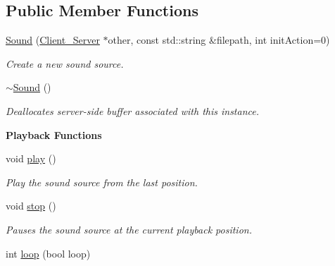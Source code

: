 \subsection*{Public Member Functions}
\begin{DoxyCompactItemize}
\item 
\hypertarget{classColliderPlusPlus_1_1Sound_ac1e87781b6bb69d6a250d2eaab360994}{\hyperlink{classColliderPlusPlus_1_1Sound_ac1e87781b6bb69d6a250d2eaab360994}{Sound} (\hyperlink{classColliderPlusPlus_1_1Client__Server}{Client\-\_\-\-Server} $\ast$other, const std\-::string \&filepath, int init\-Action=0)}\label{classColliderPlusPlus_1_1Sound_ac1e87781b6bb69d6a250d2eaab360994}

\begin{DoxyCompactList}\small\item\em Create a new sound source. \end{DoxyCompactList}\item 
\hypertarget{classColliderPlusPlus_1_1Sound_a0ae9f80837e343e016952def28815072}{\hyperlink{classColliderPlusPlus_1_1Sound_a0ae9f80837e343e016952def28815072}{$\sim$\-Sound} ()}\label{classColliderPlusPlus_1_1Sound_a0ae9f80837e343e016952def28815072}

\begin{DoxyCompactList}\small\item\em Deallocates server-\/side buffer associated with this instance. \end{DoxyCompactList}\end{DoxyCompactItemize}
\begin{Indent}{\bf Playback Functions}\par
\begin{DoxyCompactItemize}
\item 
\hypertarget{classColliderPlusPlus_1_1Sound_a555d34089f5c74363b837ffaf4a66c45}{void \hyperlink{classColliderPlusPlus_1_1Sound_a555d34089f5c74363b837ffaf4a66c45}{play} ()}\label{classColliderPlusPlus_1_1Sound_a555d34089f5c74363b837ffaf4a66c45}

\begin{DoxyCompactList}\small\item\em Play the sound source from the last position. \end{DoxyCompactList}\item 
\hypertarget{classColliderPlusPlus_1_1Sound_a7010e6bcdd47d51b359c364883574a5d}{void \hyperlink{classColliderPlusPlus_1_1Sound_a7010e6bcdd47d51b359c364883574a5d}{stop} ()}\label{classColliderPlusPlus_1_1Sound_a7010e6bcdd47d51b359c364883574a5d}

\begin{DoxyCompactList}\small\item\em Pauses the sound source at the current playback position. \end{DoxyCompactList}\item 
int \hyperlink{classColliderPlusPlus_1_1Sound_aad17d4b990faae4cf90c281e33d06155}{loop} (bool loop)
\end{DoxyCompactItemize}
\end{Indent}


